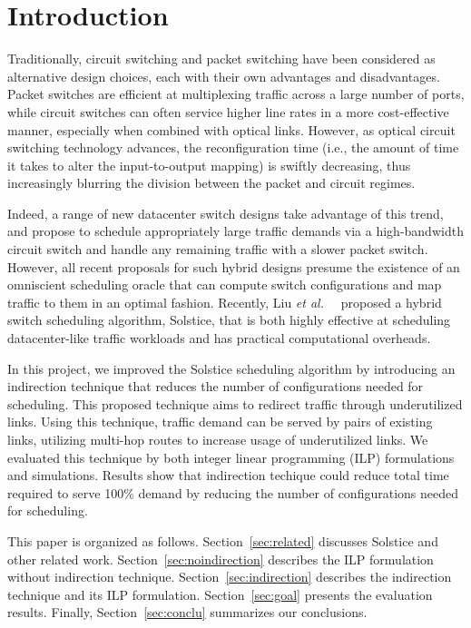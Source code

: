 \section{Introduction}

Traditionally, circuit switching and packet switching have been
considered as alternative design choices, each with their own advantages
and disadvantages. Packet switches are efficient at multiplexing traffic
across a large number of ports, while circuit switches can often service
higher line rates in a more cost-effective manner, especially when
combined with optical links. However, as optical circuit switching
technology advances, the reconfiguration time (i.e., the amount of time
it takes to alter the input-to-output mapping) is swiftly decreasing,
thus increasingly blurring the division between the packet and circuit
regimes.

Indeed, a range of new datacenter switch designs take advantage of this
trend, and propose to schedule appropriately large traffic demands via a
high-bandwidth circuit switch and handle any remaining traffic with a
slower packet switch. However, all recent proposals for such hybrid
designs presume the existence of an omniscient scheduling oracle that
can compute switch configurations and map traffic to them in an optimal
fashion. Recently, Liu \textit{et al.\ }~\cite{Liu:2015} proposed a
hybrid switch scheduling algorithm, Solstice, that is both
highly effective at scheduling datacenter-like traffic workloads and has
practical computational overheads.

In this project, we improved the Solstice scheduling algorithm by
introducing an indirection technique that reduces the number of
configurations needed for scheduling. This proposed technique
aims to redirect traffic through underutilized links. Using this technique,
traffic demand can be served by pairs of existing links, utilizing
multi-hop routes to increase usage of underutilized links.
We evaluated this technique by both integer linear programming (ILP)
formulations and simulations. Results show that indirection techique could
reduce total time required to serve 100\% demand by reducing the number
of configurations needed for scheduling.

This paper is organized as follows.
Section~\ref{sec:related} discusses Solstice and other related work.
Section~\ref{sec:noindirection} describes the ILP formulation without
indirection technique.
Section~\ref{sec:indirection} describes the indirection
technique and its ILP formulation. Section~\ref{sec:goal} presents the
evaluation results. Finally, Section~\ref{sec:conclu} summarizes our conclusions.

